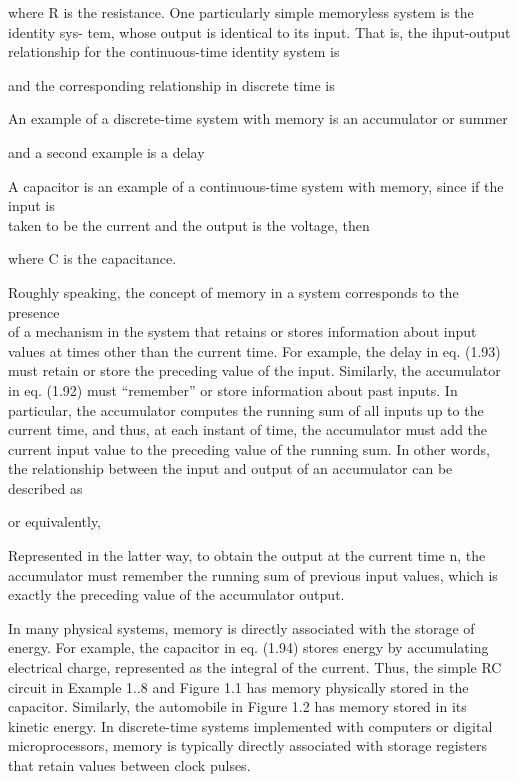 \documentclass{report}
\begin{document}
where R is the resistance. One particularly simple memoryless system is the identity sys- tem, whose output is identical to its input. That is, the
ihput-output relationship for the continuous-time identity system is



and the corresponding relationship in discrete time is



An example of a discrete-time system with memory is an accumulator or summer



and a second example is a delay



A capacitor is an example of a continuous-time system with memory, since if the input is\\
taken to be the current and the output is the voltage, then



where C is the capacitance.

Roughly speaking, the concept of memory in a system corresponds to the presence\\
of a mechanism in the system that retains or stores information about input values at times other than the current time. For example, the delay in
eq. (1.93) must retain or store the preceding value of the input. Similarly, the accumulator in eq. (1.92) must {``}remember{''} or store information
about past inputs. In particular, the accumulator computes the running sum of all inputs up to the current time, and thus, at each instant of time,
the accumulator must add the current input value to the preceding value of the running sum. In other words, the relationship between the input and
output of an accumulator can be described as



or equivalently,



Represented in the latter way, to obtain the output at the current time n, the accumulator must remember the running sum of previous input values,
which is exactly the preceding value of the accumulator output.

In many physical systems, memory is directly associated with the storage of energy. For example, the capacitor in eq. (1.94) stores energy by accumulating
electrical charge, represented as the integral of the current. Thus, the simple RC circuit in Example 1..8 and Figure 1.1 has memory physically stored
in the capacitor. Similarly, the automobile in Figure 1.2 has memory stored in its kinetic energy. In discrete-time systems implemented with computers
or digital microprocessors, memory is typically directly associated with storage registers that retain values between clock pulses.
\end{document}
